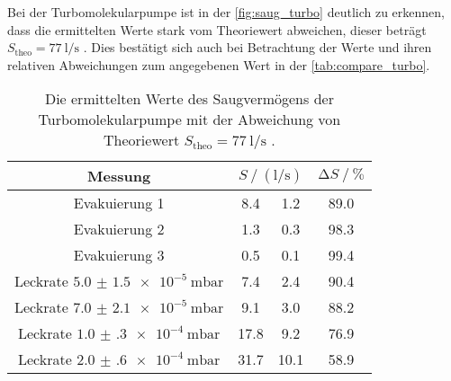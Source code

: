 \noindent Bei der Turbomolekularpumpe ist in der \autoref{fig:saug_turbo} deutlich zu erkennen, dass die ermittelten Werte stark vom Theoriewert abweichen, dieser beträgt $S_\text{theo} =
\SI{77}{\litre\per\second}$ \cite{anleitung}. Dies bestätigt sich auch bei Betrachtung der Werte und ihren relativen Abweichungen zum angegebenen Wert in der \autoref{tab:compare_turbo}. 

\begin{table}
    \centering
    \caption{Die ermittelten Werte des Saugvermögens der Turbomolekularpumpe mit der Abweichung von Theoriewert $S_\text{theo} = \SI{77}{\litre\per\second}$ \cite{anleitung}.}
    \label{tab:compare_turbo}
    \begin{tabular}{c  S @{${}\pm{}$} S  S}
        \toprule
        {Messung} &  & {$\increment S  \mathbin{/} \si{\percent}$} \\ 
        \midrule
        Evakuierung 1                           & 8.4 & 1.2 & 89.0\\
        Evakuierung 2                           & 1.3 & 0.3 & 98.3\\
        Evakuierung 3                           & 0.5 & 0.1 & 99.4\\
        Leckrate $\SI{5.0(15)e-5}{\milli\bar}$  & 7.4 & 2.4 & 90.4\\
        Leckrate $\SI{7.0(21)e-5}{\milli\bar}$  & 9.1 & 3.0 & 88.2\\
        Leckrate $\SI{1.0(3)e-4}{\milli\bar}$   &17.8 & 9.2 & 76.9\\
        Leckrate $\SI{2.0(6)e-4}{\milli\bar}$   &31.7 &10.1 & 58.9\\
        \bottomrule
    \end{tabular}
\end{table}

